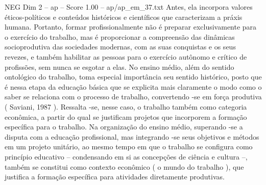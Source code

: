 \begin{textsample}{NEG Dim 2 – ap – Score 1.00 – ap/ap\_em\_37.txt}
Antes, ela incorpora valores éticos-políticos e conteúdos históricos e científicos que caracterizam a práxis humana.
Portanto, formar profissionalmente não é preparar exclusivamente para o exercício do trabalho, mas é proporcionar a compreensão das dinâmicas socioprodutiva das sociedades modernas, com as suas conquistas e os seus revezes, e também habilitar as pessoas para o exercício autônomo e crítico de profissões, sem nunca se esgotar a elas.
No ensino médio, além do sentido ontológico do trabalho, toma especial importância seu sentido histórico, posto que é nessa etapa da educação básica que se explicita mais claramente o modo como o saber se relaciona com o processo de trabalho, convertendo -se em força produtiva ( Saviani, 1987 ).
Ressalta -se, nesse caso, o trabalho também como categoria econômica, a partir do qual se justificam projetos que incorporem a formação específica para o trabalho.
Na organização do ensino médio, superando -se a disputa com a educação profissional, mas integrando -se seus objetivos e métodos em um projeto unitário, ao mesmo tempo em que o trabalho se configura como princípio educativo – condensando em si as concepções de ciência e cultura –, também se constitui como contexto econômico ( o mundo do trabalho ), que justifica a formação específica para atividades diretamente produtivas.

\end{textsample}

